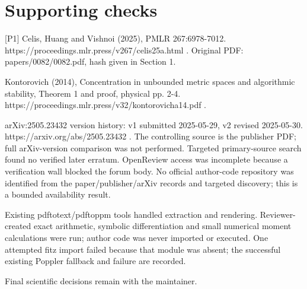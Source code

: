 \documentclass[10pt]{article}
\begin{document}
\section*{Supporting checks}
[P1] Celis, Huang and Vishnoi (2025), PMLR 267:6978-7012. https://proceedings.mlr.press/v267/celis25a.html . Original PDF: papers/0082/0082.pdf, hash given in Section 1.\par
[P2] Kontorovich (2014), Concentration in unbounded metric spaces and algorithmic stability, Theorem 1 and proof, physical pp. 2-4. https://proceedings.mlr.press/v32/kontorovicha14.pdf .\par
[P3] arXiv:2505.23432 version history: v1 submitted 2025-05-29, v2 revised 2025-05-30. https://arxiv.org/abs/2505.23432 . The controlling source is the publisher PDF; full arXiv-version comparison was not performed. Targeted primary-source search found no verified later erratum. OpenReview access was incomplete because a verification wall blocked the forum body. No official author-code repository was identified from the paper/publisher/arXiv records and targeted discovery; this is a bounded availability result.\par
Existing pdftotext/pdftoppm tools handled extraction and rendering. Reviewer-created exact arithmetic, symbolic differentiation and small numerical moment calculations were run; author code was never imported or executed. One attempted fitz import failed because that module was absent; the successful existing Poppler fallback and failure are recorded.\par
Final scientific decisions remain with the maintainer.\par
\end{document}
